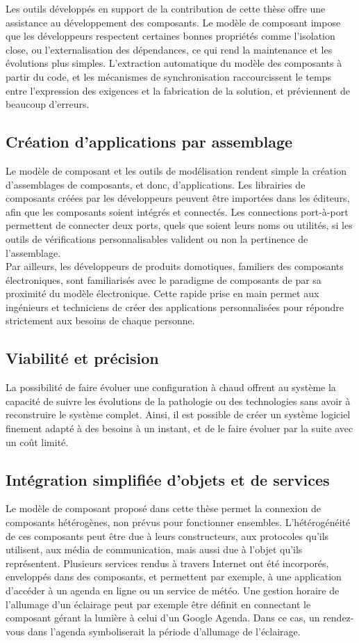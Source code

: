 Les outils développés en support de la contribution de cette thèse offre une assistance au développement des composants. Le modèle de composant impose que les développeurs respectent certaines bonnes propriétés comme l'isolation close, ou l'externalisation des dépendances, ce qui rend la maintenance et les évolutions plus simples. L'extraction automatique du modèle des composants à partir du code, et les mécanismes de synchronisation raccourcissent le temps entre l'expression des exigences et la fabrication de la solution, et préviennent de beaucoup d'erreurs.


\subsection{Création d'applications par assemblage}
Le modèle de composant et les outils de modélisation rendent simple la création d'assemblages de composants, et donc, d'applications. Les librairies de composants créées par les développeurs peuvent être importées dans les éditeurs, afin que les composants soient intégrés et connectés. Les connections port-à-port permettent de connecter deux ports, quels que soient leurs noms ou utilités, si les outils de vérifications personnalisables valident ou non la pertinence de l'assemblage.\\
Par ailleurs, les développeurs de produits domotiques, familiers des composants électroniques, sont familiarisés avec le paradigme de composants de par sa proximité du modèle électronique. Cette rapide prise en main permet aux ingénieurs et techniciens de créer des applications personnalisées pour répondre strictement aux besoins de chaque personne.

\subsection{Viabilité et précision}
La possibilité de faire évoluer une configuration à chaud offrent au système la capacité de suivre les évolutions de la pathologie ou des technologies sans avoir à reconstruire le système complet. Ainsi, il est possible de créer un système logiciel finement adapté à des besoins à un instant, et de le faire évoluer par la suite avec un coût limité.

\subsection{Intégration simplifiée d'objets et de services}
Le modèle de composant proposé dans cette thèse permet la connexion de composants hétérogènes, non prévus pour fonctionner ensembles. L'hétérogénéité de ces composants peut être due à leurs constructeurs, aux protocoles qu'ils utilisent, aux média de communication, mais aussi due à l'objet qu'ils représentent. Plusieurs services rendus à travers Internet ont été incorporés, enveloppés dans des composants, et permettent par exemple, à une application d'accéder à un agenda en ligne ou un service de météo. Une gestion horaire de l'allumage d'un éclairage peut par exemple \^etre définit en connectant le composant gérant la lumière à celui d'un Google Agenda. Dans ce cas, un rendez-vous dans l'agenda symboliserait la période d'allumage de l'éclairage.


